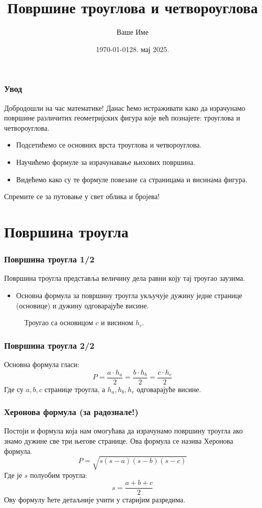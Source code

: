 \documentclass{beamer}
\title{Површине троуглова и четвороуглова}
\author{Ваше Име} %
\date{\today} %
\institute{ОШ „Иван Горан Ковачић“, Станишић}
\date{28. мај 2025.}
\begin{document}
\frame{\titlepage}

\begin{frame}
\frametitle{Увод 📐📏}
Добродошли на час математике! Данас ћемо истраживати како да израчунамо површине различитих геометријских фигура које већ познајете: троуглова и четвороуглова.
\begin{itemize}
    \item Подсетићемо се основних врста троуглова и четвороуглова.
    \item Научићемо формуле за израчунавање њихових површина.
    \item Видећемо како су те формуле повезане са страницама и висинама фигура.
\end{itemize}
Спремите се за путовање у свет облика и бројева!
\end{frame}

\section{Површина троугла}

\begin{frame}
\frametitle{Површина троугла 1/2}
Површина троугла представља величину дела равни коју тај троугао заузима.
\begin{itemize}
    \item Основна формула за површину троугла укључује дужину једне странице (основице) и дужину одговарајуће висине.
\end{itemize}
\begin{figure}
    \centering
    \caption{Троугао са основицом $c$ и висином $h_c$.}
\end{figure}
\end{frame}

\begin{frame}
\frametitle{Површина троугла 2/2}
Основна формула гласи:
$$P = \frac{a \cdot h_a}{2} = \frac{b \cdot h_b}{2} = \frac{c \cdot h_c}{2}$$
Где су $a, b, c$ странице троугла, а $h_a, h_b, h_c$ одговарајуће висине.
\end{frame}

\begin{frame}
\frametitle{Херонова формула (за радознале!)}
Постоји и формула која нам омогућава да израчунамо површину троугла ако знамо дужине све три његове странице. Ова формула се назива Херонова формула.
$$P = \sqrt{s(s-a)(s-b)(s-c)}$$
Где је $s$ полуобим троугла:
$$s = \frac{a+b+c}{2}$$
Ову формулу ћете детаљније учити у старијим разредима.
\end{frame}
\end{document}
